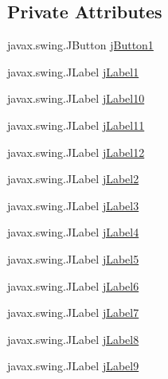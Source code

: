 \subsection*{Private Attributes}
\begin{DoxyCompactItemize}
\item 
javax.\+swing.\+J\+Button \mbox{\hyperlink{class_interfaz_package_1_1_consulta_libro_a690d079d1efa9d0a7efd0cce09c7f375}{j\+Button1}}
\item 
javax.\+swing.\+J\+Label \mbox{\hyperlink{class_interfaz_package_1_1_consulta_libro_ac77c7946cb8103b592bd26c93868e6dc}{j\+Label1}}
\item 
javax.\+swing.\+J\+Label \mbox{\hyperlink{class_interfaz_package_1_1_consulta_libro_aa72af154332185cfbed0dec73bd34450}{j\+Label10}}
\item 
javax.\+swing.\+J\+Label \mbox{\hyperlink{class_interfaz_package_1_1_consulta_libro_ae94f652b20072c79107b06192a514608}{j\+Label11}}
\item 
javax.\+swing.\+J\+Label \mbox{\hyperlink{class_interfaz_package_1_1_consulta_libro_a22c3d5f2c9bebc19190d3eb57195b720}{j\+Label12}}
\item 
javax.\+swing.\+J\+Label \mbox{\hyperlink{class_interfaz_package_1_1_consulta_libro_af5b8586972d0b220d8fc909d2566798f}{j\+Label2}}
\item 
javax.\+swing.\+J\+Label \mbox{\hyperlink{class_interfaz_package_1_1_consulta_libro_a3e4a05b55099ee80351bac56cdc1734b}{j\+Label3}}
\item 
javax.\+swing.\+J\+Label \mbox{\hyperlink{class_interfaz_package_1_1_consulta_libro_a38c193843e6fdef8523b06eb32530cde}{j\+Label4}}
\item 
javax.\+swing.\+J\+Label \mbox{\hyperlink{class_interfaz_package_1_1_consulta_libro_a49a4d4fb7a30f3fa6d4fe697b5bace17}{j\+Label5}}
\item 
javax.\+swing.\+J\+Label \mbox{\hyperlink{class_interfaz_package_1_1_consulta_libro_aa7ab64f2b86ab31bd150020068712678}{j\+Label6}}
\item 
javax.\+swing.\+J\+Label \mbox{\hyperlink{class_interfaz_package_1_1_consulta_libro_a218a7656528bb232eab4f384fed1254e}{j\+Label7}}
\item 
javax.\+swing.\+J\+Label \mbox{\hyperlink{class_interfaz_package_1_1_consulta_libro_afc512066b447316ce167de196273232f}{j\+Label8}}
\item 
javax.\+swing.\+J\+Label \mbox{\hyperlink{class_interfaz_package_1_1_consulta_libro_ae312eda737e35580e0221ddbd8c17292}{j\+Label9}}
\end{DoxyCompactItemize}


